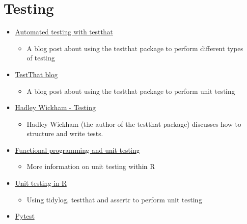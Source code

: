\documentclass[
]{book}
\providecommand{\tightlist}{%
  \setlength{\itemsep}{0pt}\setlength{\parskip}{0pt}}
\begin{document}
\hypertarget{testing-1}{%
\section{Testing}\label{testing-1}}

\begin{itemize}
\tightlist
\item
  \href{https://www.r-bloggers.com/automated-testing-with-testthat-in-practice/}{Automated testing with testthat}

  \begin{itemize}
  \tightlist
  \item
    A blog post about using the testthat package to perform different types of testing
  \end{itemize}
\item
  \href{https://katherinemwood.github.io/post/testthat/}{TestThat blog}

  \begin{itemize}
  \tightlist
  \item
    A blog post about using the testthat package to perform unit testing
  \end{itemize}
\item
  \href{http://r-pkgs.had.co.nz/tests.html}{Hadley Wickham - Testing}

  \begin{itemize}
  \tightlist
  \item
    Hadley Wickham (the author of the testthat package) discusses how to structure and write tests.
  \end{itemize}
\item
  \href{https://b-rodrigues.github.io/fput/unit-testing.html\#unit-testing-with-the-testthat-package}{Functional programming and unit testing}

  \begin{itemize}
  \tightlist
  \item
    More information on unit testing within R
  \end{itemize}
\item
  \href{https://billster45.github.io/rapid_r_data_vis_book/intro.html\#qa-and-unit-tests}{Unit testing in R}

  \begin{itemize}
  \tightlist
  \item
    Using tidylog, testthat and assertr to perform unit testing
  \end{itemize}
\item
  \href{https://docs.pytest.org/en/latest/}{Pytest}


\end{itemize}
\end{document}

